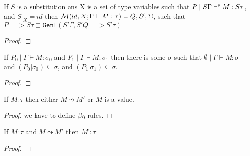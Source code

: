
\begin{theorem}[Completeness of $\M$.]
  If $S$ is a substitution ans X is a set of type variables such that
  $P \mid S\Gamma \vdash^s M: S\tau$, and $S|_X = id$ then $\mathcal{M}(id, X; \Gamma \vdash M:\tau) = Q, S', \Sigma$, such that
  $P => S\tau \sqsubset \texttt{GenI}(S'\Gamma, S' Q => S' \tau)$
\end{theorem}
\begin{proof}
\end{proof}

\begin{theorem}
  If $P_0 \mid  \Gamma \vdash M : \sigma_0$ and $P_1 \mid  \Gamma \vdash M : \sigma_1$ then there is some $\sigma$ such that
  $\emptyset \mid \Gamma \vdash M : \sigma$ and $(P_0 | \sigma_0) \subseteq \sigma$, and $(P_1 | \sigma_1) \subseteq \sigma$.
\end{theorem}
\begin{proof}
\end{proof}

\begin{framed}
{\color{red}  \begin{theorem}[Progress.]
    If $M:\tau$ then either  $M \leadsto M'$ or $M$ is a value.
  \end{theorem}
\begin{proof}
  we have to define $\beta \eta$ rules.
\end{proof}

\begin{theorem}[Preservation.]
  If $M:\tau$ and $M \leadsto M'$ then $M':\tau$
\end{theorem}
\begin{proof}
\end{proof}
}
\end{framed}



